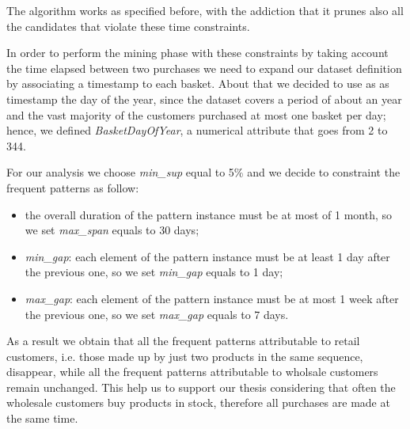 The algorithm works as specified before, with the addiction that it prunes also all the candidates that violate these time constraints.

In order to perform the mining phase with these constraints by taking account the time elapsed between two purchases we need to expand our dataset definition by associating a timestamp to each basket. About that we decided to use as as timestamp the day of the year, since the dataset covers a period of about an year and the vast majority of the customers purchased at most one basket per day; hence, we defined \emph{BasketDayOfYear}, a numerical attribute that goes from 2 to 344.

For our analysis we choose \emph{min\_sup} equal to 5\% and we decide to constraint the frequent patterns as follow: 

\begin{itemize}
\item the overall duration of the pattern instance must be at most of 1 month, so we set \emph{max\_span} equals to 30 days;
\item \emph{min\_gap}: each element of the pattern instance must be at least 1 day after the previous one, so we set \emph{min\_gap} equals to 1 day;
\item \emph{max\_gap}: each element of the pattern instance must be at most 1 week after the previous one, so we set \emph{max\_gap} equals to 7 days.
\end{itemize}

As a result we obtain that all the frequent patterns attributable to retail customers, i.e. those made up by just two products in the same sequence, disappear, while all the frequent patterns attributable to wholsale customers remain unchanged. This help us to support our thesis considering that often the wholesale customers buy products in stock, therefore all purchases are made at the same time.
